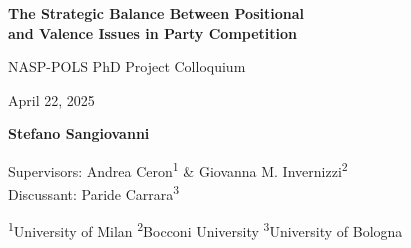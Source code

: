 \documentclass[9pt, aspectratio=169]{beamer}
\begin{document}
\begin{frame}[plain]       
       

    \vspace{1.6cm} %
    \centering
    \LARGE\textbf{The Strategic Balance Between Positional \\ and Valence Issues in Party Competition}\par
    
    \vspace{0.6cm}
    {\large NASP-POLS PhD Project Colloquium}

    {\small April 22, 2025}
    
    \vspace{0.6cm}
    \textbf{\large Stefano Sangiovanni}
    
    \vspace{0.6cm}
    \begin{minipage}{0.8\textwidth}
    \centering
    \small
    Supervisors: Andrea Ceron\textsuperscript{1} \& Giovanna M. Invernizzi\textsuperscript{2} \\
    Discussant: Paride Carrara\textsuperscript{3}
    \end{minipage}
    
    \vspace{0.6cm}
    \begin{minipage}{0.8\textwidth}
    \centering
    \footnotesize
    \textsuperscript{1}University of Milan \hspace{0.7cm} 
    \textsuperscript{2}Bocconi University \hspace{0.7cm} 
    \textsuperscript{3}University of Bologna
    \end{minipage}          
\end{frame}
\end{document}
